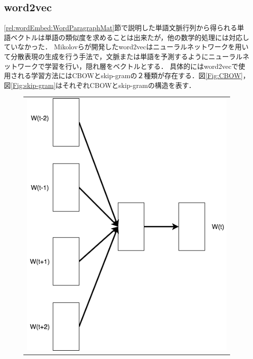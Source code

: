 \subsection{word2vec}
\ref{rel:wordEmbed:WordParagraphMat}節で説明した単語文脈行列から得られる単語ベクトルは単語の類似度を求めることは出来たが，他の数学的処理には対応していなかった．
Mikolovら\cite{word2vec}が開発したword2vecはニューラルネットワークを用いて分散表現の生成を行う手法で，文脈または単語を予測するようにニューラルネットワークで学習を行い，隠れ層をベクトルとする．
具体的にはword2vecで使用される学習方法にはCBOWとskip-gramの２種類が存在する．図\ref{Fig:CBOW}，図\ref{Fig:skip-gram}はそれぞれCBOWとskip-gramの構造を表す．
\begin{figure}[htbp]
	\begin{center}
	\begin{tabular}{c}
      		\begin{minipage}{0.5\textwidth}
       		 \begin{center}
 	 		\includegraphics[width=\hsize]{../images/2.Related_Work/CBOW.png}

\end{center}
\end{minipage}
\end{tabular}
\end{center}
\end{figure}
